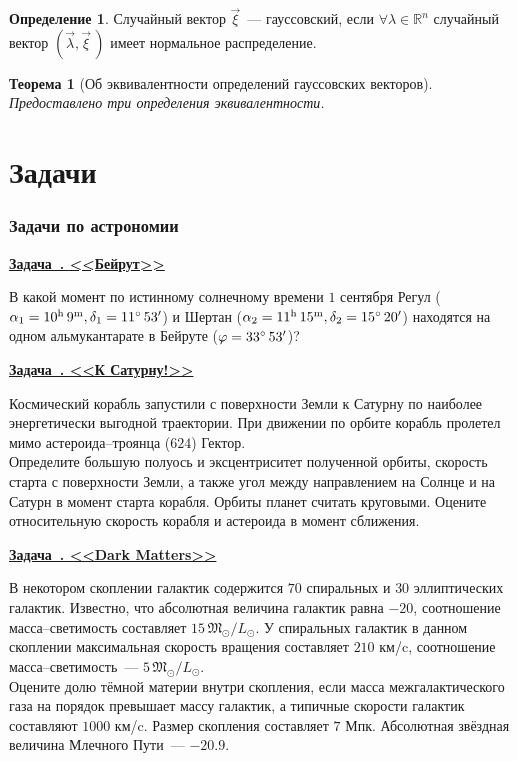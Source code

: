 \documentclass[11pt]{article}
\newtheorem{thm}{Теорема}[section]
\theoremstyle{definition}\newtheorem{defi}{Определение}
\newcounter{taskn}[section]
\newenvironment{task}[1]{%
\begin{framed}
  \noindent
  \underline{\bfseries Задача~\stepcounter{taskn}\thetaskn. <<#1>>}
  \setlength{\parindent}{0cm}
}{%
\end{framed}
}
\begin{document}
\begin{defi}

Случайный вектор $\vec \xi$~--- гауссовский, если $\forall \lambda \in \mathbb{R}^n$ случайный вектор $(\vec \lambda, \vec \xi\,)$ имеет нормальное распределение.

\end{defi}

\begin{thm}[Об эквивалентности определений гауссовских векторов]

Предоставлено три определения эквивалентности.

\end{thm}


\part{Задачи}

\section{Задачи по астрономии}

\begin{task}{Бейрут}

В какой момент по истинному солнечному времени $1$ сентября Регул ($\alpha_1 = 10^\text{h} \, 9^\text{m}, \delta_1 = 11\degree \, 53'$) и Шертан ($\alpha_2 = 11^\text{h} \, 15^\text{m}, \delta_2 = 15 \degree \, 20'$) находятся на одном альмукантарате в Бейруте ($\varphi = 33 \degree \, 53'$)?

\end{task}

\begin{task}{К Сатурну!}

Космический корабль запустили с поверхности Земли к Сатурну по наиболее энергетически выгодной траектории. При движении по орбите корабль пролетел мимо астероида--троянца ($624$) Гектор.\\[10pt]
Определите большую полуось и эксцентриситет полученной орбиты, скорость старта с поверхности Земли, а также угол между направлением на Солнце и на Сатурн в момент старта корабля. Орбиты планет считать круговыми. Оцените относительную скорость корабля и астероида в момент сближения.

\end{task}

\begin{task}{Dark Matters}

В некотором скоплении галактик содержится $70$ спиральных и $30$ эллиптических галактик. Известно, что абсолютная величина галактик равна $-20$, соотношение масса--светимость составляет $15 \, \mathfrak{M}_\odot / L_\odot$. У спиральных галактик в данном скоплении максимальная скорость вращения составляет $210$ км/c, соотношение масса--светимость~--- $5 \, \mathfrak{M}_\odot / L_\odot$.\\[10pt]
Оцените долю тёмной материи внутри скопления, если масса межгалактического газа на порядок превышает массу галактик, а типичные скорости галактик составляют $1000$ км/c. Размер скопления составляет $7$ Мпк. Абсолютная звёздная величина Млечного Пути~--- $-20.9$.

\end{task}
\end{document}

